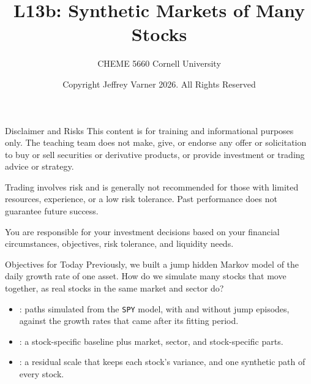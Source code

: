 \documentclass[aspectratio=169,11pt]{beamer}
\title{\texorpdfstring{{\vnheavy L13b}}{L13b}: Synthetic Markets of Many Stocks}
\subtitle{CHEME 5660 Cornell University}
\author{Copyright Jeffrey Varner 2026. All Rights Reserved}
\begin{document}
\vntitlepage

\begin{frame}{Disclaimer and Risks}
  \vspace{0.6em}
  \textbf{} This content is for training and informational
  purposes only. The teaching team does not make, give, or endorse any offer or
  solicitation to buy or sell securities or derivative products, or provide
  investment or trading advice or strategy.

  \vspace{1.1em}
  \textbf{} Trading involves risk and is generally not recommended for
  those with limited resources, experience, or a low risk tolerance. Past
  performance does not guarantee future success.

  \vspace{1.1em}
  \textbf{} You are responsible for your investment decisions
  based on your financial circumstances, objectives, risk tolerance, and
  liquidity needs.
\end{frame}

\begin{frame}{Objectives for Today}
  Previously, we built a jump hidden Markov model of the daily growth rate of one asset.
  How do we simulate many stocks that move together, as real stocks in the same market
  and sector do?

  \vspace{0.5em}
  {\large\textbf{}}
  \begin{itemize}\setlength{\itemsep}{0.4em}
    \item {}: paths simulated from the \texttt{SPY} model, with
      and without jump episodes, against the growth rates that came after its fitting period.
    \item {}: a stock-specific baseline plus market,
      sector, and stock-specific parts.
    \item {}: a residual scale that keeps each stock's
      variance, and one synthetic path of every stock.
  \end{itemize}
\end{frame}
\end{document}
